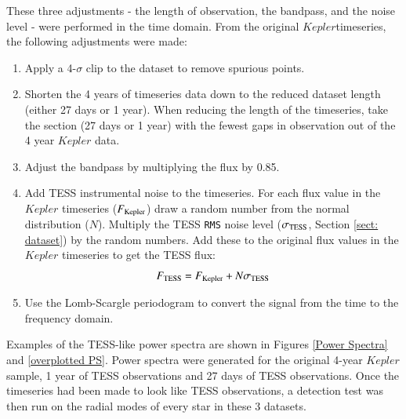 \documentclass[a4paper,fleqn,usenatbib,useAMS]{mnras}
\newcommand{\kep}{\ensuremath{Kepler}\:}
\begin{document}
These three adjustments - the length of observation, the bandpass, and the noise level - were performed in the time domain. From the original \kep timeseries, the following adjustments were made:
\begin{enumerate}
\item Apply a 4-$\sigma$ clip to the dataset to remove spurious points.
\item Shorten the 4 years of timeseries data down to the reduced dataset length (either 27 days or 1 year). When reducing the length of the timeseries, take the section (27 days or 1 year) with the fewest gaps in observation out of the 4 year $Kepler$ data.%
\item Adjust the bandpass by multiplying the flux by 0.85.
\item Add TESS instrumental noise to the timeseries. For each flux value in the $Kepler$ timeseries ($F_{\rm Kepler}$) draw a random number from the normal distribution ($N$). Multiply the TESS \texttt{RMS} noise level ($\sigma_{\rm TESS}$, Section \ref{sect: dataset}) by the random numbers. Add these to the original flux values in the $Kepler$ timeseries to get the TESS flux:
\begin{equation}
F_{\rm TESS} = F_{\rm Kepler} + N\sigma_{\rm TESS}
\end{equation}

\item Use the Lomb-Scargle periodogram to convert the signal from the time to the frequency domain.
\end{enumerate}

Examples of the TESS-like power spectra are shown in Figures \ref{Power Spectra} and \ref{overplotted PS}. Power spectra were generated for the original 4-year \kep sample, 1 year of TESS observations and 27 days of TESS observations. Once the timeseries had been made to look like TESS observations, a detection test was then run on the radial modes of every star in these 3 datasets. 
\end{document}
